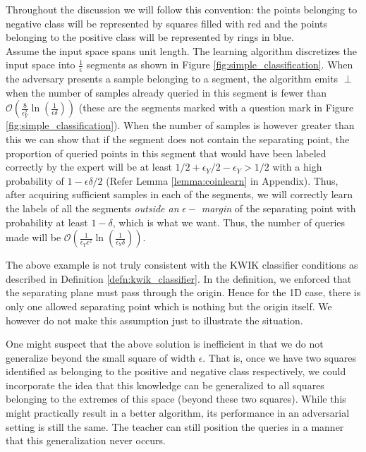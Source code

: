 Throughout the discussion we will follow this convention: the points belonging to negative class will be represented by {\color{red} squares filled with red} and the points belonging to the positive class will be represented by {\color{blue} rings in blue.}\\

 Assume the input space spans unit length. The learning algorithm discretizes the input space into $\frac{1}{\epsilon}$  segments as shown in Figure \ref{fig:simple_classification}. When the adversary presents a sample belonging to a segment, the algorithm emits $\perp$ when the number of samples already queried in this segment is fewer than $\mathcal{O}(\frac{8}{\epsilon_Y^2} \ln(\frac{1}{\epsilon\delta}))$ (these are the segments marked with a question mark in Figure \ref{fig:simple_classification}). When the number of samples is however greater than this  we can show that if the segment does not contain the separating point, the proportion of queried points in this segment that would have been labeled correctly by the expert will be at least $1/2 + \epsilon_Y/2 - \epsilon_Y > 1/2$ with a high probability  of $1-\epsilon\delta/2$ (Refer Lemma \ref{lemma:coinlearn} in Appendix). Thus, after acquiring sufficient samples in each of the segments, we will correctly learn the labels of all the segments \textit{outside an} $\epsilon-$ \textit{margin }of the separating point with probability at least $1-\delta$, which is what we want. Thus, the number of queries made will be $\mathcal{O}(\frac{1}{\epsilon_Y\epsilon^2} \ln(\frac{1}{\epsilon_Y\delta}))$.
 
 \begin{remark}
 The above example is not truly consistent with the KWIK classifier conditions as described in Definition \ref{defn:kwik_classifier}. In the definition, we enforced that the separating plane must pass through the origin. Hence for the 1D case, there is only one allowed separating point which is nothing but the origin itself. We however do not make this assumption just to illustrate the situation.
 \end{remark}

\begin{remark}
One might suspect that the above solution is inefficient in that we do not generalize beyond the small square of width $\epsilon$. That is, once we have two squares identified as belonging to the positive and negative class respectively, we could incorporate the idea that this knowledge can be generalized to all squares belonging to the extremes of this space (beyond these two squares). While this might practically result in a better algorithm, its performance in an adversarial setting is still the same. The teacher can still position the queries in  a manner that this generalization never occurs.
\end{remark}

